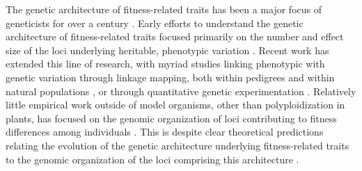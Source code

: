 \documentclass[smallextended]{svjour3}
\begin{document}
The genetic architecture of fitness-related traits has been a major focus of
geneticists for over a century \citep[reviewed by][]{Ellegren:2008}.  Early
efforts to understand the genetic architecture of fitness-related traits focused
primarily on the number and effect size of the loci underlying heritable,
phenotypic variation \citep{Fisher:1918}.  Recent work has extended this line of
research, with myriad studies linking phenotypic with genetic variation through
linkage mapping, both within pedigrees \citep{Mauricio:2001, Neale:2011,
  Ritland:2011} and within natural populations \citep{Ingvarsson:2011,
  Eckert:2013a}, or through quantitative genetic experimentation
\citep{Anderson:2013a, Anderson:2013b, Fournier-Level:2013}. Relatively little
empirical work outside of model organisms, other than polyploidization in
plants, has focused on the genomic organization of loci contributing to fitness
differences among individuals \citep[but see][]{Stevison:2011}. This is despite
clear theoretical predictions relating the evolution of the genetic architecture
underlying fitness-related traits to the genomic organization of the loci
comprising this architecture \citep{Kirkpatrick:2006, Yeaman:2011, Yeaman:2013,
  Akerman:2014}.
\end{document}
